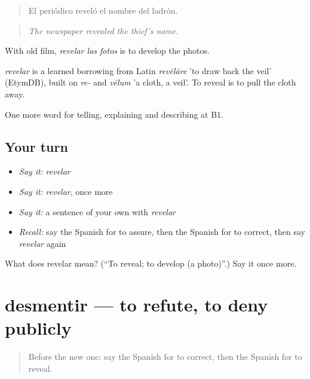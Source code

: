 \begin{quote}
El periódico reveló el nombre del ladrón.
\end{quote}

\begin{quote}
\emph{The newspaper revealed the thief's name.}
\end{quote}

With old film, \emph{revelar las fotos} is to develop the photos.

\begin{cousinweb}
\emph{revelar} is a learned borrowing from Latin \emph{revēlāre} 'to draw back the veil' (EtymDB), built on \emph{re-} and \emph{vēlum} 'a cloth, a veil'. To reveal is to pull the cloth away.
\end{cousinweb}

\begin{grammarlens}[title={What you've built}]
One more word for telling, explaining and describing at B1.
\end{grammarlens}

\subsection*{Your turn}
\begin{itemize}
\raggedright
  \item \emph{Say it:} \emph{revelar}
  \item \emph{Say it:} \emph{revelar}, once more
  \item \emph{Say it:} a sentence of your own with \emph{revelar}
  \item \emph{Recall:} say the Spanish for to assure, then the Spanish for to correct, then say \emph{revelar} again
\end{itemize}

\begin{tcolorbox}[breakable,colback=teal!4,colframe=teal!35!black,title={Before you move on}]
What does revelar mean? (\textquotedblleft{}To reveal; to develop (a photo)\textquotedblright{}.) Say it once more.
\end{tcolorbox}
\section[desmentir]{desmentir — to refute, to deny publicly}

\label{lesson:ES-C516-desmentir}



\begin{quote}
Before the new one: say the Spanish for to correct, then the Spanish for to reveal.
\end{quote}

